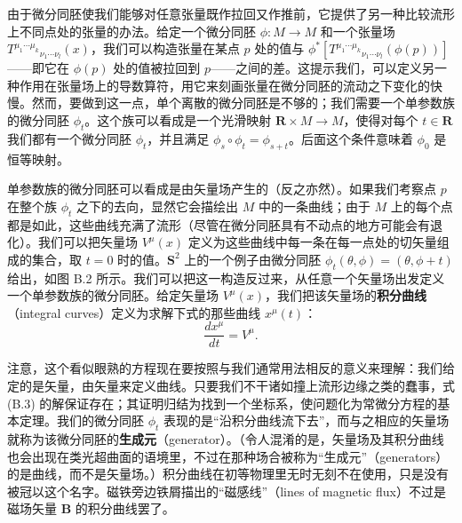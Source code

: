 由于微分同胚使我们能够对任意张量既作拉回又作推前，它提供了另一种比较流形上不同点处的张量的办法。给定一个微分同胚 $\phi : M \to M$ 和一个张量场 $T^{\mu_1\cdots\mu_k}{}_{\nu_1\cdots\nu_l}(x)$，我们可以构造张量在某点 $p$ 处的值与 $\phi^*[T^{\mu_1\cdots\mu_k}{}_{\nu_1\cdots\nu_l}(\phi(p))]$——即它在 $\phi(p)$ 处的值被拉回到 $p$——之间的差。这提示我们，可以定义另一种作用在张量场上的导数算符，用它来刻画张量在微分同胚的流动之下变化的快慢。然而，要做到这一点，单个离散的微分同胚是不够的；我们需要一个单参数族的微分同胚 $\phi_t$。这个族可以看成是一个光滑映射 $\mathbf{R} \times M \to M$，使得对每个 $t \in \mathbf{R}$ 我们都有一个微分同胚 $\phi_t$，并且满足 $\phi_s \circ \phi_t = \phi_{s+t}$。后面这个条件意味着 $\phi_0$ 是恒等映射。

单参数族的微分同胚可以看成是由矢量场产生的（反之亦然）。如果我们考察点 $p$ 在整个族 $\phi_t$ 之下的去向，显然它会描绘出 $M$ 中的一条曲线；由于 $M$ 上的每个点都是如此，这些曲线充满了流形（尽管在微分同胚具有不动点的地方可能会有退化）。我们可以把矢量场 $V^\mu(x)$ 定义为这些曲线中每一条在每一点处的切矢量组成的集合，取 $t = 0$ 时的值。$\mathbf{S}^2$ 上的一个例子由微分同胚 $\phi_t(\theta, \phi) = (\theta, \phi + t)$ 给出，如图 B.2 所示。我们可以把这一构造反过来，从任意一个矢量场出发定义一个单参数族的微分同胚。给定矢量场 $V^\mu(x)$，我们把该矢量场的\textbf{积分曲线}（integral curves）定义为求解下式的那些曲线 $x^\mu(t)$：
\begin{equation*}
\frac{d x^\mu}{d t} = V^\mu.
\tag{B.3}
\end{equation*}


注意，这个看似眼熟的方程现在要按照与我们通常用法相反的意义来理解：我们给定的是矢量，由矢量来定义曲线。只要我们不干诸如撞上流形边缘之类的蠢事，式 (B.3) 的解保证存在；其证明归结为找到一个坐标系，使问题化为常微分方程的基本定理。我们的微分同胚 $\phi_t$ 表现的是“沿积分曲线流下去”，而与之相应的矢量场就称为该微分同胚的\textbf{生成元}（generator）。（令人混淆的是，矢量场及其积分曲线也会出现在类光超曲面的语境里，不过在那种场合被称为“生成元”（generators）的是曲线，而不是矢量场。）积分曲线在初等物理里无时无刻不在使用，只是没有被冠以这个名字。磁铁旁边铁屑描出的“磁感线”（lines of magnetic flux）不过是磁场矢量 $\mathbf{B}$ 的积分曲线罢了。

